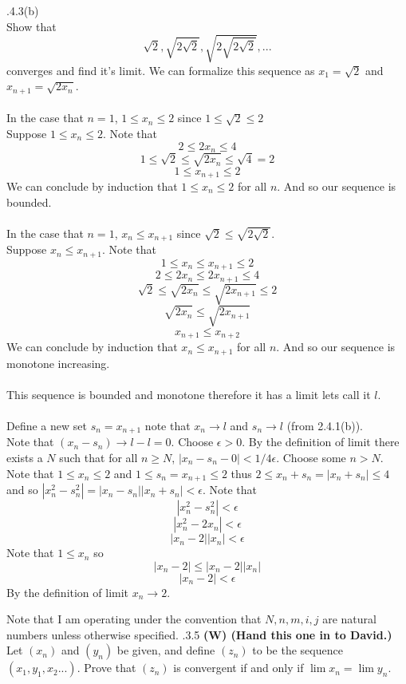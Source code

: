 \documentclass[12pt]{article}
\makeatletter
\theoremstyle{homework}
\newenvironment{exercise}[1]
{\def\@currentlabel{#1}\exercisecore}
{\endexercisecore}
\newcommand\W{{\color{red}\textbf{(W) (Hand this one in to David.)}}}
\makeatother
\begin{document}
\begin{exercise}

2.4.3(b)\\
Show that 
$$\sqrt{2},\sqrt{2\sqrt{2}},\sqrt{2\sqrt{2\sqrt{2}}},...$$
converges and find it's limit.
\end{exercise}
We can formalize this sequence as $x_1=\sqrt{2}$ and $x_{n+1}=\sqrt{2x_n}$.\\\\
In the case that $n=1$, $1\leq x_n\leq 2$ since $1\leq \sqrt{2}\leq 2$\\
Suppose $1\leq x_n\leq 2$.  Note that
$$2\leq 2x_n\leq 4$$
$$1\leq \sqrt{2}\leq \sqrt{2x_n}\leq \sqrt{4}=2$$
$$1\leq x_{n+1}\leq 2$$
We can conclude by induction that $1\leq x_n\leq 2$ for all $n$.  And so our sequence is bounded.\\\\
In the case that $n=1$, $x_{n}\leq x_{n+1}$ since $\sqrt{2}\leq \sqrt{2\sqrt{2}}$.\\
Suppose $x_{n}\leq x_{n+1}$.  Note that
$$1\leq x_{n}\leq x_{n+1}\leq 2$$
$$2\leq 2x_{n}\leq 2x_{n+1}\leq 4$$
$$\sqrt{2}\leq \sqrt{2x_{n}}\leq \sqrt{2x_{n+1}}\leq 2$$
$$\sqrt{2x_{n}}\leq \sqrt{2x_{n+1}}$$
$$x_{n+1}\leq x_{n+2}$$
We can conclude by induction that $x_{n}\leq x_{n+1}$ for all $n$.  And so our sequence is monotone increasing.\\\\
This sequence is bounded and monotone therefore it has a limit lets call it $l$.\\\\
Define a new set $s_n = x_{n+1}$ note that $x_n\rightarrow l$ and $s_n\rightarrow l$ (from 2.4.1(b)).\\
Note that $(x_n-s_n)\rightarrow l-l=0$.  Choose $\epsilon>0$.  By the definition of limit there exists a $N$ such that for all $n\geq N$, $|x_n-s_n-0|<1/4\epsilon$.  Choose some $n>N$.  Note that $1\leq x_n\leq 2$ and $1\leq s_n=x_{n+1}\leq 2$ thus $2\leq x_n+s_n=|x_n+s_n|\leq 4$ and so $|x_n^2-s_n^2|=|x_n-s_n||x_n+s_n|<\epsilon$.  Note that
$$|x_n^2-s_n^2|<\epsilon$$
$$|x_n^2-2x_n|<\epsilon$$
$$|x_n-2||x_n|<\epsilon$$
Note that $1\leq x_n$ so
$$|x_n-2|\leq|x_n-2||x_n|$$
$$|x_n-2|<\epsilon$$
By the definition of limit $x_n\rightarrow 2$.




\newpage

Note that I am operating under the convention that $N,n,m,i,j$ are natural numbers unless otherwise specified.
\begin{exercise}

2.3.5 \W\\
Let $(x_n)$ and $(y_n)$ be given, and define $(z_n)$ to be the sequence $(x_1,y_1,x_2...)$.  Prove that $(z_n)$ is convergent if and only if $\lim x_n=\lim y_n$.
\end{exercise}
\end{document}
